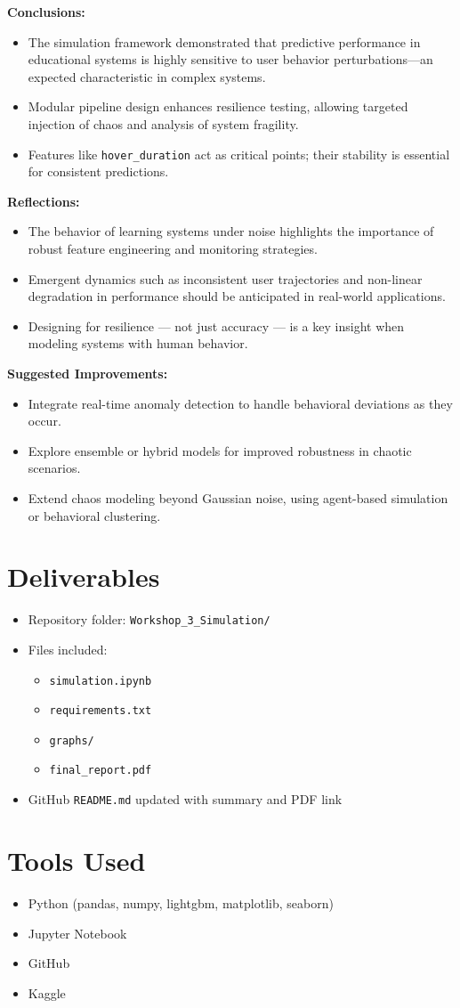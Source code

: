 \documentclass[12pt]{article}
\begin{document}
\textbf{Conclusions:}
\begin{itemize}
	\item The simulation framework demonstrated that predictive performance in educational systems is highly sensitive to user behavior perturbations—an expected characteristic in complex systems.
	\item Modular pipeline design enhances resilience testing, allowing targeted injection of chaos and analysis of system fragility.
	\item Features like \texttt{hover\_duration} act as critical points; their stability is essential for consistent predictions.
\end{itemize}

\textbf{Reflections:}
\begin{itemize}
	\item The behavior of learning systems under noise highlights the importance of robust feature engineering and monitoring strategies.
	\item Emergent dynamics such as inconsistent user trajectories and non-linear degradation in performance should be anticipated in real-world applications.
	\item Designing for resilience — not just accuracy — is a key insight when modeling systems with human behavior.
\end{itemize}

\textbf{Suggested Improvements:}
\begin{itemize}
	\item Integrate real-time anomaly detection to handle behavioral deviations as they occur.
	\item Explore ensemble or hybrid models for improved robustness in chaotic scenarios.
	\item Extend chaos modeling beyond Gaussian noise, using agent-based simulation or behavioral clustering.
\end{itemize}
	
	\section{Deliverables}
	\begin{itemize}
		\item Repository folder: \texttt{Workshop\_3\_Simulation/}
		\item Files included:
		\begin{itemize}
			\item \texttt{simulation.ipynb}
			\item \texttt{requirements.txt}
			\item \texttt{graphs/}
			\item \texttt{final\_report.pdf}
		\end{itemize}
		\item GitHub \texttt{README.md} updated with summary and PDF link
	\end{itemize}
	
	\section*{Tools Used}
	\begin{itemize}
		\item Python (pandas, numpy, lightgbm, matplotlib, seaborn)
		\item Jupyter Notebook
		\item GitHub
		\item Kaggle
	\end{itemize}
	
\end{document}
